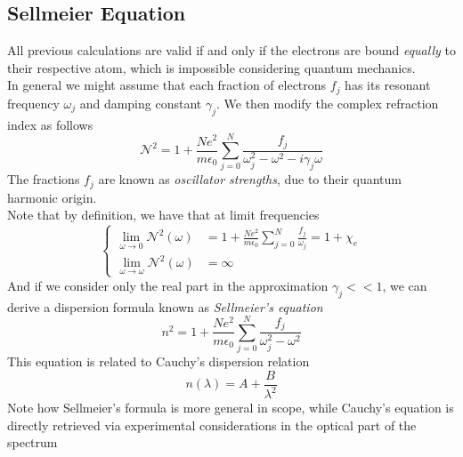 \documentclass[../electromagnetism.tex]{subfiles}
\begin{document}
\subsection{Sellmeier Equation}
All previous calculations are valid if and only if the electrons are bound \textit{equally} to their respective atom, which is impossible considering quantum mechanics.\\
In general we might assume that each fraction of electrons $f_j$ has its resonant frequency $\omega_j$ and damping constant $\gamma_j$. We then modify the complex refraction index as follows
\begin{equation}
	\mathcal{N}^2=1+\frac{Ne^2}{m\epsilon_0}\sum_{j=0}^N\frac{f_j}{\omega_j^2-\omega^2-i\gamma_j\omega}
	\label{eq:sellmeier1.diesol}
\end{equation}
The fractions $f_j$ are known as \textit{oscillator strengths}, due to their quantum harmonic origin.\\
Note that by definition, we have that at limit frequencies
\begin{equation}
	\left\{ \begin{aligned}
			\lim_{\omega\to0}\mathcal{N}^2\left( \omega \right)&= 1+\frac{Ne^2}{m\epsilon_0}\sum_{j=0}^N\frac{f_j}{\omega_j}=1+\chi_e\\
			\lim_{\omega\to\omega}\mathcal{N}^2\left( \omega \right)&= \infty
	\end{aligned}\right.
	\label{eq:considerations1.diesol}
\end{equation}
And if we consider only the real part in the approximation $\gamma_j<<1$, we can derive a dispersion formula known as \textit{Sellmeier's equation}
\begin{equation}
	n^2=1+\frac{Ne^2}{m\epsilon_0}\sum_{j=0}^N\frac{f_j}{\omega_j^2-\omega^2}
	\label{eq:sellmeier.diesol}
\end{equation}
This equation is related to Cauchy's dispersion relation
\begin{equation}
	n\left( \lambda \right)=A+\frac{B}{\lambda^2}
	\label{eq:cauchydispersion.diesol}
\end{equation}
Note how Sellmeier's formula is more general in scope, while Cauchy's equation is directly retrieved via experimental considerations in the optical part of the spectrum
\end{document}
